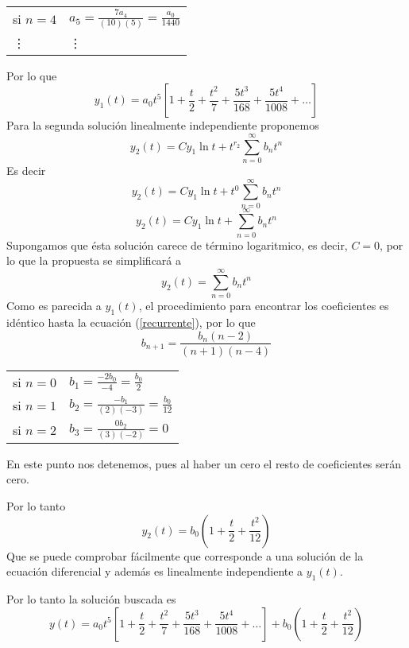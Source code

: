\documentclass{article}
\begin{document}
\begin{enumerate}
{\begin{center}
\begin{tabular}{ll}
                    si $n=4$ & $a_5=\frac{7a_4}{(10)(5)}=\frac{a_0}{1440}$ \\
                    \vdots   & \vdots
                \end{tabular}
            \end{center}
            Por lo que 
            \[
                y_1(t)=a_0t^5\left[
                    1+\frac{t}{2}+\frac{t^2}{7}+\frac{5t^3}{168}+\frac{5t^4}{1008}+\ldots
                \right]
            \]
            Para la segunda solución linealmente independiente proponemos
            $$y_2(t)=Cy_1\ln{t}+t^{r_2}\sum_{n=0}^{\infty}{b_nt^{n}}$$
            Es decir
            $$y_2(t)=Cy_1\ln{t}+t^{0}\sum_{n=0}^{\infty}{b_nt^{n}}$$
            $$y_2(t)=Cy_1\ln{t}+\sum_{n=0}^{\infty}{b_nt^{n}}$$
            Supongamos que ésta solución carece de término logaritmico, es decir, $C=0$, por lo que la propuesta se
            simplificará a
            $$y_2(t)=\sum_{n=0}^{\infty}{b_nt^{n}}$$
            Como es parecida a $y_1(t)$, el procedimiento para encontrar los coeficientes es idéntico hasta la ecuación
            (\ref{recurrente}), por lo que
            \[
                b_{n+1}=\frac{b_n(n-2)}{(n+1)(n-4)}
            \]
            \begin{center}
                \begin{tabular}{ll}
                    si $n=0$ & $b_1=\frac{-2b_0}{-4}=\frac{b_0}{2}$ \\
                    si $n=1$ & $b_2=\frac{-b_1}{(2)(-3)}=\frac{b_0}{12}$ \\
                    si $n=2$ & $b_3=\frac{0b_2}{(3)(-2)}=0$ \\
                \end{tabular}
            \end{center}
            En este punto nos detenemos, pues al haber un cero el resto de coeficientes serán cero.

            Por lo tanto
            \[
                y_2(t)=b_0\left(1+\frac{t}{2}+\frac{t^2}{12}\right)
            \]
            Que se puede comprobar fácilmente que corresponde a una solución de la ecuación diferencial y además es
            linealmente independiente a $y_1(t)$.

            Por lo tanto la solución buscada es
            \[
                y(t)=
                a_0t^5\left[1+\frac{t}{2}+\frac{t^2}{7}+\frac{5t^3}{168}+\frac{5t^4}{1008}+\ldots\right]
                +b_0\left(1+\frac{t}{2}+\frac{t^2}{12}\right)
            \]
        }


\end{enumerate}
\end{document}
